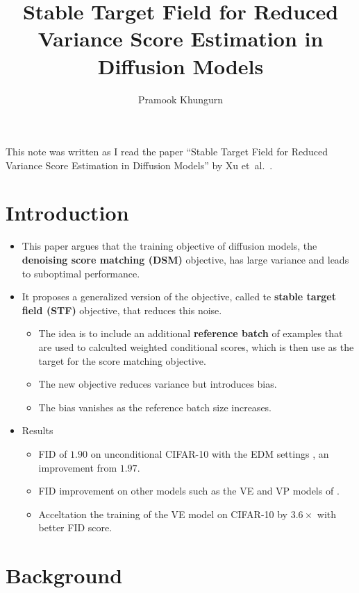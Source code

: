 \documentclass[10pt]{article}
\title{Stable Target Field for Reduced Variance Score Estimation in Diffusion Models}
\author{Pramook Khungurn}
\newcommand{\etal}{{et~al.}}
\begin{document}
\maketitle

This note was written as I read the paper ``Stable Target Field for Reduced Variance Score Estimation in Diffusion Models'' by Xu \etal~\cite{Xu:2023}.

\section{Introduction}

\begin{itemize}
  \item This paper argues that the training objective of diffusion models, the {\bf denoising score matching (DSM)} objective, has large variance and leads to suboptimal performance.
  
  \item It proposes a generalized version of the objective, called te {\bf stable target field (STF)} objective, that reduces this noise.
  \begin{itemize}
    \item The idea is to include an additional {\bf reference batch} of examples that are used to calculted weighted conditional scores, which is then use as the target for the score matching objective.
    
    \item The new objective reduces variance but introduces bias.
    
    \item The bias vanishes as the reference batch size increases.
  \end{itemize}

  \item Results
  \begin{itemize}
    \item FID of $1.90$ on unconditional CIFAR-10 with the EDM settings \cite{Karras:2022}, an improvement from $1.97$.
    \item FID improvement on other models such as the VE and VP models of \cite{Song:2021}.
    \item Acceltation the training of the VE model on CIFAR-10 by $3.6\times$ with better FID score.    
  \end{itemize}
\end{itemize}

\section{Background}
\end{document}
